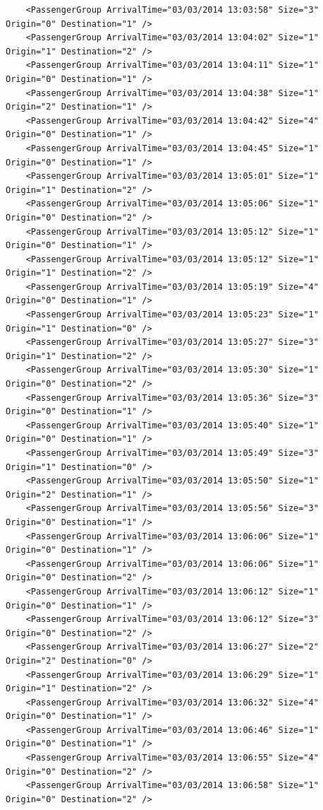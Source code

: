 \documentclass{UoYCSproject}
\begin{document}
\begin{appendices}
\begin{lstlisting}
	<PassengerGroup ArrivalTime="03/03/2014 13:03:58" Size="3" Origin="0" Destination="1" />
	<PassengerGroup ArrivalTime="03/03/2014 13:04:02" Size="1" Origin="1" Destination="2" />
	<PassengerGroup ArrivalTime="03/03/2014 13:04:11" Size="1" Origin="0" Destination="1" />
	<PassengerGroup ArrivalTime="03/03/2014 13:04:38" Size="1" Origin="2" Destination="1" />
	<PassengerGroup ArrivalTime="03/03/2014 13:04:42" Size="4" Origin="0" Destination="1" />
	<PassengerGroup ArrivalTime="03/03/2014 13:04:45" Size="1" Origin="0" Destination="1" />
	<PassengerGroup ArrivalTime="03/03/2014 13:05:01" Size="1" Origin="1" Destination="2" />
	<PassengerGroup ArrivalTime="03/03/2014 13:05:06" Size="1" Origin="0" Destination="2" />
	<PassengerGroup ArrivalTime="03/03/2014 13:05:12" Size="1" Origin="0" Destination="1" />
	<PassengerGroup ArrivalTime="03/03/2014 13:05:12" Size="1" Origin="1" Destination="2" />
	<PassengerGroup ArrivalTime="03/03/2014 13:05:19" Size="4" Origin="0" Destination="1" />
	<PassengerGroup ArrivalTime="03/03/2014 13:05:23" Size="1" Origin="1" Destination="0" />
	<PassengerGroup ArrivalTime="03/03/2014 13:05:27" Size="3" Origin="1" Destination="2" />
	<PassengerGroup ArrivalTime="03/03/2014 13:05:30" Size="1" Origin="0" Destination="2" />
	<PassengerGroup ArrivalTime="03/03/2014 13:05:36" Size="3" Origin="0" Destination="1" />
	<PassengerGroup ArrivalTime="03/03/2014 13:05:40" Size="1" Origin="0" Destination="1" />
	<PassengerGroup ArrivalTime="03/03/2014 13:05:49" Size="3" Origin="1" Destination="0" />
	<PassengerGroup ArrivalTime="03/03/2014 13:05:50" Size="1" Origin="2" Destination="1" />
	<PassengerGroup ArrivalTime="03/03/2014 13:05:56" Size="3" Origin="0" Destination="1" />
	<PassengerGroup ArrivalTime="03/03/2014 13:06:06" Size="1" Origin="0" Destination="1" />
	<PassengerGroup ArrivalTime="03/03/2014 13:06:06" Size="1" Origin="0" Destination="2" />
	<PassengerGroup ArrivalTime="03/03/2014 13:06:12" Size="1" Origin="0" Destination="1" />
	<PassengerGroup ArrivalTime="03/03/2014 13:06:12" Size="3" Origin="0" Destination="2" />
	<PassengerGroup ArrivalTime="03/03/2014 13:06:27" Size="2" Origin="2" Destination="0" />
	<PassengerGroup ArrivalTime="03/03/2014 13:06:29" Size="1" Origin="1" Destination="2" />
	<PassengerGroup ArrivalTime="03/03/2014 13:06:32" Size="4" Origin="0" Destination="1" />
	<PassengerGroup ArrivalTime="03/03/2014 13:06:46" Size="1" Origin="0" Destination="1" />
	<PassengerGroup ArrivalTime="03/03/2014 13:06:55" Size="4" Origin="0" Destination="2" />
	<PassengerGroup ArrivalTime="03/03/2014 13:06:58" Size="1" Origin="0" Destination="2" />

\end{lstlisting}
\end{appendices}
\end{document}
